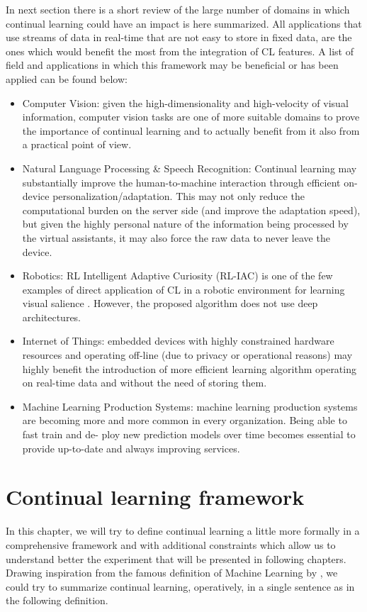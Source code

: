 \documentclass[english, LaM, oneside]{sapthesis}%
\begin{document}
In next section there is a short review of the large number of domains in which continual learning could have an impact is here summarized. All applications that use streams of data in real-time that are not easy to store in fixed data, are the ones which would benefit the most from the integration of CL features. A list of field and applications in which this framework may be beneficial or has been applied can be found below:
\begin{itemize}
    \item Computer Vision: given the high-dimensionality and high-velocity of visual information, computer vision tasks are one of more suitable domains to prove the importance of continual learning and to actually benefit from it also from a practical point of view.
    \item Natural Language Processing & Speech Recognition: Continual learning may substantially improve the human-to-machine interaction through efficient on-device personalization/adaptation. This may not only reduce the computational burden on the server side (and improve the adaptation speed), but given the highly personal nature of the information being processed by the virtual assistants, it may also force the raw data to never leave the device.
    \item Robotics: RL Intelligent Adaptive Curiosity (RL-IAC) is one of the few examples of direct application of CL in a robotic environment for learning visual salience \cite{creaye}. However, the proposed algorithm does not use deep architectures.
    \item Internet of Things: embedded devices with highly constrained hardware resources and operating off-line (due to privacy or operational reasons) may highly benefit the introduction of more efficient learning algorithm operating on real-time data and without the need of storing them. 
    \item Machine Learning Production Systems: machine learning production systems are becoming more and more common in every organization. Being able to fast train and de- ploy new prediction models over time becomes essential to provide up-to-date and always improving services. 
\end{itemize}
\chapter{Continual learning framework}
\label{chap:3}
In this chapter, we will try to define continual learning a little more formally in a comprehensive framework and with additional constraints which allow us to understand better the experiment that will be presented in following chapters.
Drawing inspiration from the famous definition of Machine Learning by \cite{michalski}, we could try to summarize continual learning, operatively, in a single sentence as in the following definition.
\end{document}
